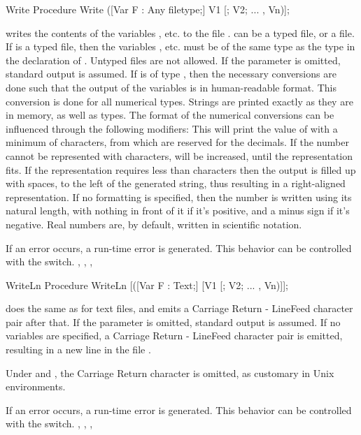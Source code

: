 \begin{procedure}{Write}
\Declaration
Procedure Write ([Var F : Any filetype;] V1 [; V2; ... , Vn)];

\Description
{} writes the contents of the variables ,  etc. to
the file .  can be a typed file, or a  file.
If  is a typed file, then the variables ,  etc. must
be of the same type as the type in the declaration of . Untyped files
are not allowed.
If the parameter  is omitted, standard output is assumed.
If  is of type , then the necessary conversions are done
such that the output of the variables is in human-readable format.
This conversion is done for all numerical types. Strings are printed exactly
as they are in memory, as well as  types.
The format of the numerical conversions can be influenced through
the following modifiers:
This will print the value of  with a minimum of
 characters, from which  are reserved for the
decimals. If the number cannot be represented with  characters,
 will be increased, until the representation fits. If the
representation requires less than  characters then the output
is filled up with spaces, to the left of the generated string, thus
resulting in a right-aligned representation.
If no formatting is specified, then the number is written using its natural
length, with nothing in front of it if it's positive, and a minus sign if
it's negative.
Real numbers are, by default, written in scientific notation.

\Errors
If an error occurs, a run-time error is generated. This behavior can be
controlled with the  switch.
\SeeAlso
{}, , , 
\end{procedure}
\begin{procedure}{WriteLn}
\Declaration
Procedure WriteLn [([Var F : Text;] [V1 [; V2; ... , Vn)]];

\Description
{} does the same as  for text files, and emits a
Carriage Return - LineFeed character pair after that.
If the parameter  is omitted, standard output is assumed.
If no variables are specified, a Carriage Return - LineFeed character pair
is emitted, resulting in a new line in the file .
\begin{remark}
Under \linux and \unix, the Carriage Return character is omitted, as
customary in Unix environments.
\end{remark}

\Errors
If an error occurs, a run-time error is generated. This behavior can be
controlled with the  switch.
\SeeAlso
{}, , , 
\end{procedure}

